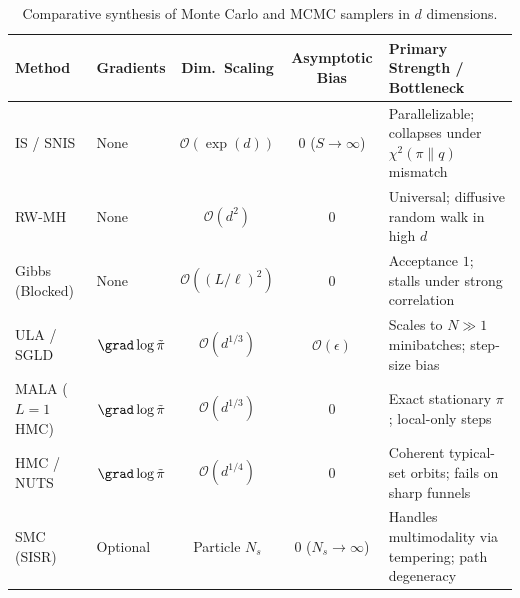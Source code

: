 \documentclass[../../../../master.tex]{subfiles}
\begin{document}
\begin{algorithm}[htbp]
\caption{Metropolis-Adjusted Langevin Algorithm (MALA) / ULA}
\label{alg:mcmc:mala}
\end{algorithm}

\begin{table}[htbp]
\centering
\caption{Comparative synthesis of Monte Carlo and MCMC samplers in $d$ dimensions.}
\label{tab:mcmc:comparison}
\begin{tabularx}{\linewidth}{@{} l l c c X @{}}
\toprule
\textbf{Method} & \textbf{Gradients} & \textbf{Dim.\ Scaling} & \textbf{Asymptotic Bias} & \textbf{Primary Strength / Bottleneck} \\
\midrule
IS / SNIS & None & $\mathcal{O}(\exp(d))$ & $0$ ($S\to\infty$) & Parallelizable; collapses under $\chi^2(\pi\|q)$ mismatch \\
RW-MH & None & $\mathcal{O}(d^2)$ & $0$ & Universal; diffusive random walk in high $d$ \\
Gibbs (Blocked) & None & $\mathcal{O}((L/\ell)^2)$ & $0$ & Acceptance $1$; stalls under strong correlation \\
ULA / SGLD & $\grad\log\tilde{\pi}$ & $\mathcal{O}(d^{1/3})$ & $\mathcal{O}(\epsilon)$ & Scales to $N\gg 1$ minibatches; step-size bias \\
MALA ($L=1$ HMC) & $\grad\log\tilde{\pi}$ & $\mathcal{O}(d^{1/3})$ & $0$ & Exact stationary $\pi$; local-only steps \\
HMC / NUTS & $\grad\log\tilde{\pi}$ & $\mathcal{O}(d^{1/4})$ & $0$ & Coherent typical-set orbits; fails on sharp funnels \\
SMC (SISR) & Optional & Particle $N_s$ & $0$ ($N_s\to\infty$) & Handles multimodality via tempering; path degeneracy \\
\bottomrule
\end{tabularx}
\end{table}
\end{document}
